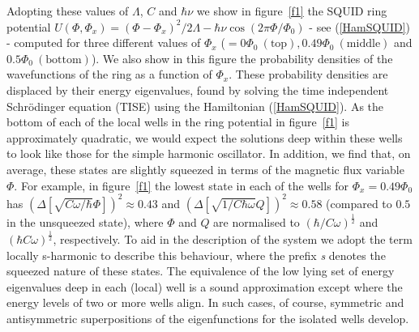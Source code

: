 \documentclass[12pt,a4paper,superscriptaddress,showpacs,floatfix,pra]{revtex4-2}
\begin{document}
Adopting these values  of $\Lambda $, $C$ and $\hbar \nu  $ we show in
figure~\ref{f1}   the  SQUID  ring   potential  $U\left(   \Phi  ,\Phi
_{x}\right)  =\left( \Phi -\Phi  _{x}\right) ^{2}/2\Lambda  -\hbar \nu
\cos \left(  2\pi \Phi  /\Phi _{0}\right) $  - see  (\ref{HamSQUID}) -
computed  for   three  different   values  of  $\Phi   _{x}$  ($=0\Phi
_{0}\mathrm{\ (top)},0.49\Phi  _{0}\mathrm{\ (middle)} $  and $0.5\Phi
_{0}\mathrm{\ (bottom)}$). We also show in this figure the probability
densities  of the wavefunctions  of the  ring as  a function  of $\Phi
_{x}$.  These  probability densities  are  displaced  by their  energy
eigenvalues,  found by  solving the  time  independent Schr\"{o}dinger
equation (TISE) using the  Hamiltonian (\ref{HamSQUID}). As the bottom
of each of the local wells in the ring potential in figure~\ref{f1} is
approximately  quadratic, we  would expect  the solutions  deep within
these wells to look like  those for the simple harmonic oscillator. In
addition, we find that, on average, these states are slightly squeezed
in  terms of  the  magnetic flux  variable  $\Phi $.  For example,  in
figure~\ref{f1}  the lowest  state  in  each of  the  wells for  $\Phi
_{x}=0.49\Phi  _{0}$ has  $\left( \Delta  \left[  \sqrt{C\omega /\hbar
}\Phi  \right] \right)  ^{2}\approx  0.43$ and  $\left( \Delta  \left[
\sqrt{1/C\hbar \omega  }Q\right] \right) ^{2}\approx  0.58 $ (compared
to  $0.5$  in  the  unsqueezed  state),  where $\Phi  $  and  $Q$  are
normalised  to  $\left(  \hbar  /C\omega \right)  ^{\frac{1}{2}}$  and
$\left( \hbar C\omega \right) ^{\frac{1}{2}}$, respectively. To aid in
the description of the system  we adopt the term locally s-harmonic to
describe  this  behaviour,  where  the  prefix  \emph{s}  denotes  the
squeezed nature of these states.  The equivalence of the low lying set
of  energy  eigenvalues   deep  in  each  (local)  well   is  a  sound
approximation  except where  the energy  levels of  two or  more wells
align.  In   such  cases,  of  course,   symmetric  and  antisymmetric
superpositions of the eigenfunctions for the isolated wells develop.
\end{document}
